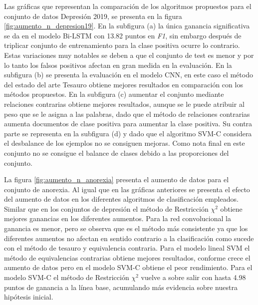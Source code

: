 Las gráficas que representan la comparación de los algoritmos propuestos para el conjunto de datos Depresión 2019, se presenta en la figura \ref{fig:aumento_n_depresion19}. En la subfigura (a) la única ganancia significativa se da en el modelo Bi-LSTM con 13.82 puntos en \textit{F1}, sin embargo después de triplicar conjunto de entrenamiento para la clase positiva ocurre lo contrario. Estas variaciones muy notables se deben a que el conjunto de test es menor y por lo tanto los falsos positivos afectan en gran medida en la evaluación. En la subfigura (b) se presenta la evaluación en el modelo CNN, en este caso el método del estado del arte Tesauro obtiene mejores resultados en comparación con los métodos propuestos. En la subfigura (c) aumentar el conjunto mediante relaciones contrarias obtiene mejores resultados, aunque se le puede atribuir al peso que se le asigna a las palabras, dado que el método de relaciones contrarias aumenta documentos de clase positiva para aumentar la clase positiva. Su contra parte se representa en la subfigura (d)  y dado que el algoritmo SVM-C considera el desbalance de los ejemplos no se consiguen mejoras. Como nota final en este conjunto no se consigue el balance de clases debido a las proporciones del conjunto.


La figura \ref{fig:aumento_n_anorexia} presenta el aumento de datos para el conjunto de anorexia. Al igual que en las gráficas anteriores se presenta el efecto del aumento de datos en los diferentes algoritmos de clasificación empleados. Similar que en los conjuntos de depresión el método de Restricción $\chi^2$ obtiene mejores ganancias en los diferentes aumentos. Para la red convolucional la ganancia es menor, pero se observa que es el método más consistente ya que los diferentes aumentos no afectan en sentido contrario a la clasificación como sucede con el método de tesauro y equivalencia contraria. Para el modelo lineal SVM el método de equivalencias contrarias obtiene mejores resultados, conforme crece el aumento de datos pero en el modelo SVM-C obtiene el peor rendimiento. Para el modelo SVM-C el método de Restricción $\chi^2$ vuelve a sobre salir con hasta 4.98 puntos de ganancia a la línea base, acumulando más evidencia sobre nuestra hipótesis inicial.





\newpage


\newpage

\newpage

